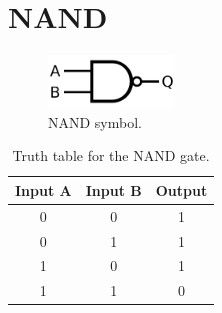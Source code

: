 \section{NAND}
	\begin{figure}[H]
	    \centering
	    \includegraphics[width=0.3\textwidth]{figures/symbols/NAND.png}
	    \caption{NAND symbol.}
	    \label{fig:NAND_sym} 
	\end{figure}

    \begin{table}[ht]
    \centering
    \begin{tabular}{|c|c|c|}
        \hline
        Input A & Input B & Output \\
        \hline
        0 & 0 & 1 \\
        0 & 1 & 1 \\
        1 & 0 & 1 \\
        1 & 1 & 0 \\
        \hline
    \end{tabular}
    \caption{Truth table for the NAND gate.}
    \end{table}